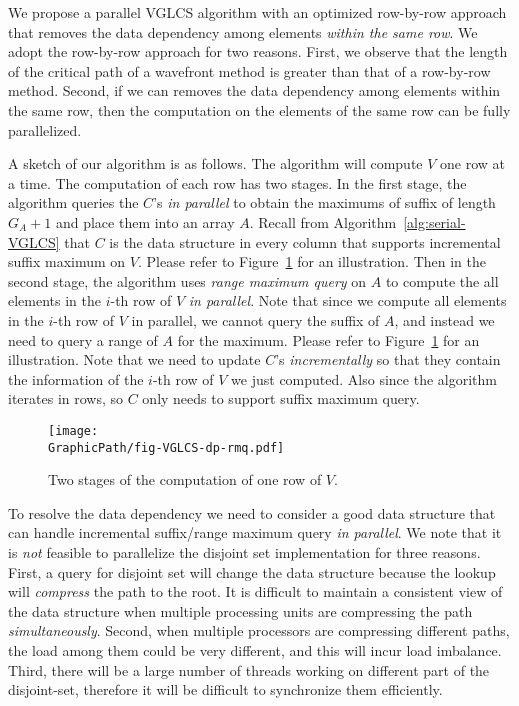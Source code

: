 

We propose a parallel VGLCS algorithm with an optimized row-by-row
approach that removes the data dependency among elements {\em within
  the same row}.  We adopt the row-by-row approach for two reasons.
First, we observe that the length of the critical path of a wavefront
method is greater than that of a row-by-row method.  Second, if we can
removes the data dependency among elements within the same row, then
the computation on the elements of the same row can be fully
parallelized.

A sketch of our algorithm is as follows.  The algorithm will compute
$V$ one row at a time.  The computation of each row has two stages.
In the first stage, the algorithm queries the $C$'s {\em in parallel}
to obtain the maximums of suffix of length $G_A + 1$ and place them
into an array $A$.  Recall from Algorithm~\ref{alg:serial-VGLCS} that
$C$ is the data structure in every column that supports incremental
suffix maximum on $V$.  Please refer to
Figure~\ref{fig:fig-VGLCS-dp-rmq} for an illustration.  Then in the
second stage, the algorithm uses {\em range maximum query} on $A$ to
compute the all elements in the $i$-th row of $V$ {\em in parallel}.
Note that since we compute all elements in the $i$-th row of $V$ in
parallel, we cannot query the suffix of $A$, and instead we need to
query a range of $A$ for the maximum.  Please refer to
Figure~\ref{fig:fig-VGLCS-dp-rmq} for an illustration.  Note that we
need to update $C$'s {\em incrementally} so that they contain the
information of the $i$-th row of $V$ we just computed.  Also since the
algorithm iterates in rows, so $C$ only needs to support suffix
maximum query.

\begin{figure}
  \texttt{[image: \\GraphicPath/fig-VGLCS-dp-rmq.pdf]}
  \caption{Two stages of the computation of one row of $V$.}
  \label{fig:fig-VGLCS-dp-rmq}
\end{figure}

To resolve the data dependency we need to consider a good data
structure that can handle incremental suffix/range maximum query {\em
  in parallel}.  We note that it is {\em not} feasible to parallelize
the disjoint set implementation for three reasons.  First, a query for
disjoint set will change the data structure because the lookup will
{\em compress} the path to the root.  It is difficult to maintain a
consistent view of the data structure when multiple processing units
are compressing the path {\em simultaneously}.  Second, when multiple
processors are compressing different paths, the load among them could
be very different, and this will incur load imbalance. Third, there
will be a large number of threads working on different part of the
disjoint-set, therefore it will be difficult to synchronize them
efficiently.

